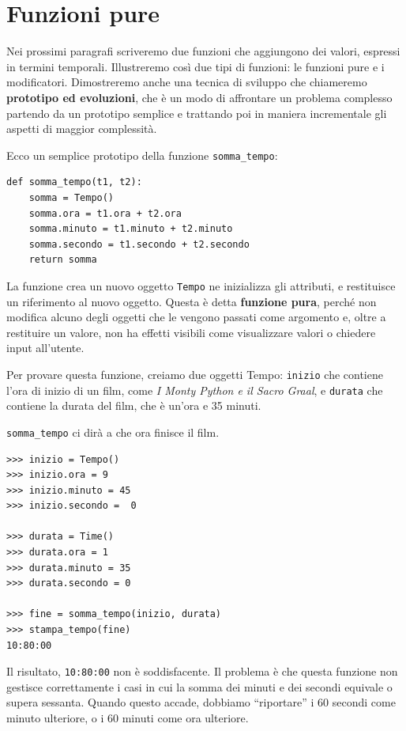 \documentclass[10pt]{book}
\begin{document}
\section{Funzioni pure}

Nei prossimi paragrafi scriveremo due funzioni che aggiungono dei valori, espressi in termini temporali. Illustreremo così due tipi di funzioni: le funzioni pure e i modificatori. Dimostreremo anche una tecnica di sviluppo che chiameremo {\bf prototipo ed evoluzioni}, che è un modo di affrontare un problema complesso partendo da un prototipo semplice e trattando poi in maniera incrementale gli aspetti di maggior complessità.

Ecco un semplice prototipo della funzione \verb"somma_tempo":

\begin{verbatim}
def somma_tempo(t1, t2):
    somma = Tempo()
    somma.ora = t1.ora + t2.ora
    somma.minuto = t1.minuto + t2.minuto
    somma.secondo = t1.secondo + t2.secondo
    return somma
\end{verbatim}
%
La funzione crea un nuovo oggetto {\tt Tempo}  ne inizializza gli attributi, e restituisce un riferimento al nuovo oggetto. Questa è detta {\bf funzione pura},  perché non modifica alcuno degli oggetti che le vengono passati come argomento e, oltre a restituire un valore, non ha effetti visibili come visualizzare valori o chiedere input all'utente.

Per provare questa funzione, creiamo due oggetti Tempo: {\tt inizio}
che contiene l'ora di inizio di un film, come {\em I Monty Python e il Sacro Graal}, e {\tt durata} che contiene la durata del film, che è un'ora e 35 minuti.

\verb"somma_tempo" ci dirà a che ora finisce il film.

\begin{verbatim}
>>> inizio = Tempo()
>>> inizio.ora = 9
>>> inizio.minuto = 45
>>> inizio.secondo =  0

>>> durata = Time()
>>> durata.ora = 1
>>> durata.minuto = 35
>>> durata.secondo = 0

>>> fine = somma_tempo(inizio, durata)
>>> stampa_tempo(fine)
10:80:00
\end{verbatim}
%
Il risultato, {\tt 10:80:00} non è soddisfacente. Il problema è che questa funzione non gestisce correttamente i casi in cui la somma dei minuti e dei secondi equivale o supera sessanta. Quando questo accade, dobbiamo ``riportare'' i 60 secondi come minuto ulteriore, o i 60 minuti come ora ulteriore.
\end{document}
